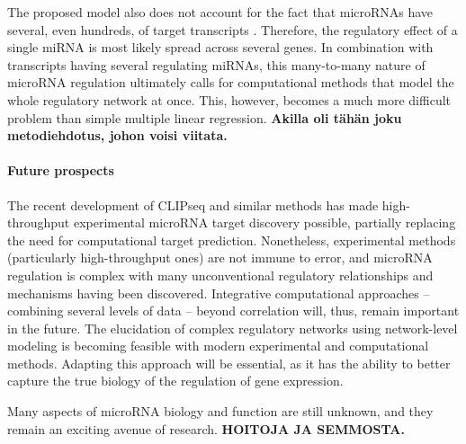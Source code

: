 The proposed model also does not account for the fact that microRNAs have
several, even hundreds, of target transcripts \citep{}. Therefore, the regulatory
effect of a single miRNA is most likely spread across several genes. In
combination with transcripts having several regulating miRNAs, this many-to-many
nature of microRNA regulation ultimately calls for computational methods
that model the whole regulatory network at once. This, however, becomes a much
more difficult problem than simple multiple linear regression. \textbf{Akilla
oli tähän joku metodiehdotus, johon voisi viitata.}

\paragraph*{Future prospects}

The recent development of CLIPseq and similar methods has made high-throughput
experimental microRNA target discovery possible, partially replacing the need
for computational target prediction. Nonetheless, experimental methods
(particularly high-throughput ones) are not immune to error, and microRNA
regulation is complex with many unconventional regulatory relationships and
mechanisms having been discovered. Integrative computational approaches --
combining several levels of data -- beyond correlation will, thus, remain
important in the future. The elucidation of complex regulatory networks using
network-level modeling is becoming feasible with modern experimental and
computational methods. Adapting this approach will be essential, as it has the
ability to better capture the true biology of the regulation of gene
expression.

Many aspects of microRNA biology and function are still unknown, and they 
remain an exciting avenue of research. \textbf{HOITOJA JA SEMMOSTA.}
